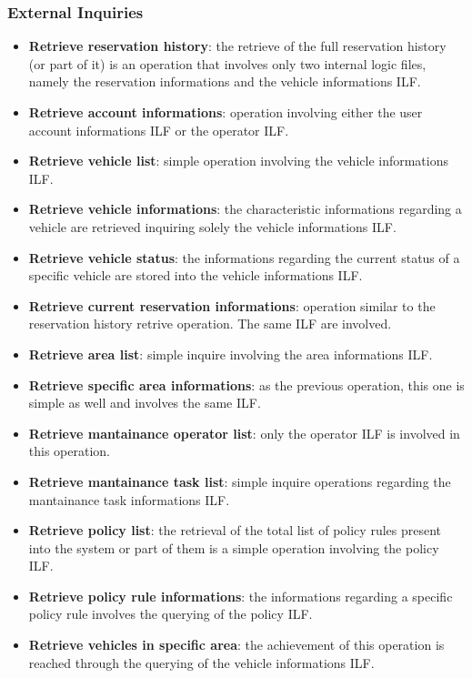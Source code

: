 \subsubsection{External Inquiries}

\begin{itemize}
	\item \textbf{Retrieve reservation history}: the retrieve of the full reservation history (or part of it) is an operation that involves only two internal logic files, namely the reservation informations and the vehicle informations ILF.

	\item \textbf{Retrieve account informations}: operation involving either the user account informations ILF or the operator ILF.

	\item \textbf{Retrieve vehicle list}: simple operation involving the vehicle informations ILF.

	\item \textbf{Retrieve vehicle informations}: the characteristic informations regarding a vehicle are retrieved inquiring solely the vehicle informations ILF.

	\item \textbf{Retrieve vehicle status}: the informations regarding the current status of a specific vehicle are stored into the vehicle informations ILF.

	\item \textbf{Retrieve current reservation informations}: operation similar to the reservation history retrive operation. The same ILF are involved.

	\item \textbf{Retrieve area list}: simple inquire involving the area informations ILF.

	\item \textbf{Retrieve specific area informations}: as the previous operation, this one is simple as well and involves the same ILF.

	\item \textbf{Retrieve mantainance operator list}: only the operator ILF is involved in this operation.

	\item \textbf{Retrieve mantainance task list}: simple inquire operations regarding the mantainance task informations ILF.

	\item \textbf{Retrieve policy list}: the retrieval of the total list of policy rules present into the system or part of them is a simple operation involving the policy ILF.

	\item \textbf{Retrieve policy rule informations}: the informations regarding a specific policy rule involves the querying of the policy ILF.

	\item \textbf{Retrieve vehicles in specific area}: the achievement of this operation is reached through the querying of the vehicle informations ILF. 
\end{itemize}

